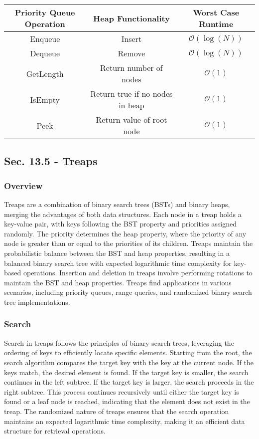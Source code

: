 \begin{center}
    \begin{tabular}[ht]{|c|c|c|}
        \hline \textbf{Priority Queue Operation} & \textbf{Heap Functionality} & \textbf{Worst Case Runtime} \\ \hline
        Enqueue & Insert & $\mathcal{O}(\log{(N)})$ \\ \hline
        Dequeue & Remove & $\mathcal{O}(\log{(N)})$ \\ \hline
        GetLength & Return number of nodes & $\mathcal{O}(1)$ \\ \hline
        IsEmpty & Return true if no nodes in heap & $\mathcal{O}(1)$ \\ \hline
        Peek & Return value of root node & $\mathcal{O}(1)$ \\ \hline
    \end{tabular}
\end{center}

\subsection*{Sec. 13.5 - Treaps}

\subsubsection{Overview}

Treaps are a combination of binary search trees (BSTs) and binary heaps, merging the advantages of both data structures. Each node in a treap holds a key-value pair, with keys following the BST 
property and priorities assigned randomly. The priority determines the heap property, where the priority of any node is greater than or equal to the priorities of its children. Treaps maintain 
the probabilistic balance between the BST and heap properties, resulting in a balanced binary search tree with expected logarithmic time complexity for key-based operations. Insertion and deletion 
in treaps involve performing rotations to maintain the BST and heap properties. Treaps find applications in various scenarios, including priority queues, range queries, and randomized binary search 
tree implementations.

\subsubsection{Search}

Search in treaps follows the principles of binary search trees, leveraging the ordering of keys to efficiently locate specific elements. Starting from the root, the search algorithm compares the target 
key with the key at the current node. If the keys match, the desired element is found. If the target key is smaller, the search continues in the left subtree. If the target key is larger, the search 
proceeds in the right subtree. This process continues recursively until either the target key is found or a leaf node is reached, indicating that the element does not exist in the treap. The randomized 
nature of treaps ensures that the search operation maintains an expected logarithmic time complexity, making it an efficient data structure for retrieval operations.

